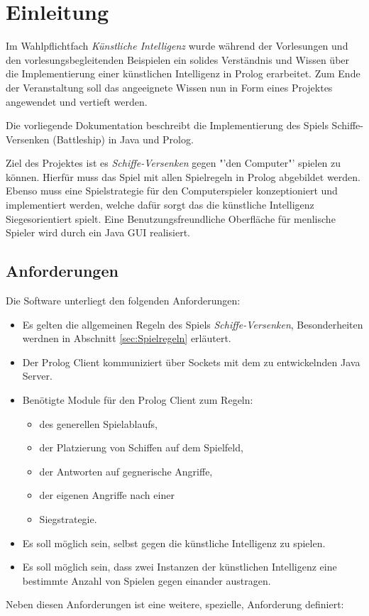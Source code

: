 \section{Einleitung}
\label{sec:Einleitung}
	Im Wahlpflichtfach \textit{Künstliche Intelligenz} wurde während der Vorlesungen und den vorlesungsbegleitenden Beispielen 
	ein solides Verständnis und Wissen über die Implementierung einer künstlichen Intelligenz 
	in Prolog erarbeitet. Zum Ende der Veranstaltung soll das angeeignete Wissen nun in 
	Form eines Projektes angewendet und vertieft werden.
	
	Die vorliegende Dokumentation beschreibt die Implementierung des Spiels Schiffe-Versenken (Battleship)
	in Java und Prolog.
	
	Ziel des Projektes ist es \textit{Schiffe-Versenken} gegen "'den Computer"' spielen zu können. Hierfür muss das Spiel mit allen Spielregeln 
	in Prolog abgebildet werden. Ebenso muss eine Spielstrategie für den Computerspieler konzeptioniert und implementiert werden, 
	welche dafür sorgt das die künstliche Intelligenz Siegesorientiert spielt. 
	Eine Benutzungsfreundliche Oberfläche für menlische Spieler wird durch ein Java GUI realisiert.
	
	
	\subsection{Anforderungen} %
	\label{sub:anforderungen}
		Die Software unterliegt den folgenden Anforderungen:
		\begin{itemize}
			\item Es gelten die allgemeinen Regeln des Spiels \textit{Schiffe-Versenken}, Besonderheiten werdnen in Abschnitt \ref{sec:Spielregeln} erläutert.
			\item Der Prolog Client kommuniziert über Sockets mit dem zu entwickelnden Java Server.
			\item Benötigte Module für den Prolog Client zum Regeln:
			\begin{itemize}
				\item des generellen Spielablaufs,
				\item der Platzierung von Schiffen auf dem Spielfeld,
				\item der Antworten auf gegnerische Angriffe,
				\item der eigenen Angriffe nach einer 
				\item Siegstrategie.
			\end{itemize}
			\item Es soll möglich sein, selbst gegen die künstliche Intelligenz zu spielen.
			\item Es soll möglich sein, dass zwei Instanzen der künstlichen Intelligenz eine bestimmte Anzahl von Spielen gegen einander 
			austragen.
		\end{itemize}
		Neben diesen Anforderungen ist eine weitere, spezielle, Anforderung definiert:
		
